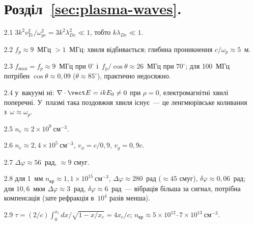 \protect \section *{Розділ~\ref *{sec:plasma-waves}. }
\begin{Solution}{2.{1}}
		$3k^2v_{Te}^2/\omega_{pe}^2=3k^2\lambda_{De}^2\ll1$, тобто $k\lambda_{De}\ll1$.
	
\end{Solution}
\begin{Solution}{2.{2}}
		$f_p\approx9$~МГц $>1$~МГц: хвиля відбивається; глибина проникнення $c/\omega_p\approx5$~м.
	
\end{Solution}
\begin{Solution}{2.{3}}
		$f_{\max}=f_p\approx9$~МГц при $0^\circ$ і~$f_p/\cos\theta\approx26$~МГц при $70^\circ$; для 100~МГц потрібен $\cos\theta\approx0{,}09$ ($\theta\approx85^\circ$), практично недосяжно.
	
\end{Solution}
\begin{Solution}{2.{4}}
		у~вакуумі ні: $\nabla\cdot\vect E=ikE_0\neq0$ при $\rho=0$, електромагнітні хвилі поперечні.
	У~плазмі така поздовжня хвиля існує~--- це ленгмюрівське коливання з~$\omega\approx\omega_p$.
	
\end{Solution}
\begin{Solution}{2.{5}}
		$n_e\approx2\times10^{9}~\text{см}^{-3}$.
	
\end{Solution}
\begin{Solution}{2.{6}}
		$n_e\approx2{,}4\times10^{5}~\text{см}^{-3}$, $v_\phi=c/0{,}9$, $v_g=0{,}9c$.
	
\end{Solution}
\begin{Solution}{2.{7}}
		$\Delta\varphi\approx56$~рад, $\approx9$ смуг.
	
\end{Solution}
\begin{Solution}{2.{8}}
		для 1~мм $n_{\mathrm{кр}}\approx1{,}1\times10^{15}~\text{см}^{-3}$,
	$\Delta\varphi\approx280$~рад ($\approx45$ смуг), $\delta\varphi\approx0{,}06$~рад; для $10{,}6$~мкм
	$\Delta\varphi\approx3$~рад, $\delta\varphi\approx6$~рад~--- вібрація більша за сигнал, потрібна компенсація
	(зате рефракція в~$10^4$ разів менша).
	
\end{Solution}
\begin{Solution}{2.{9}}
		$\tau=(2/c)\int_0^{x_c}dx/\sqrt{1-x/x_c}=4x_c/c$;
	$n_{\mathrm{кр}}\approx5\times10^{12}$--$7\times10^{13}~\text{см}^{-3}$.
	
\end{Solution}
